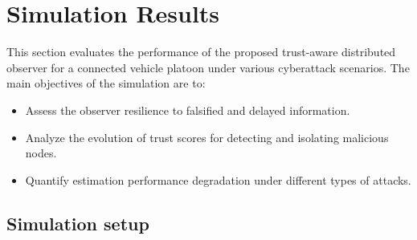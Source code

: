 \section{Simulation Results}\label{sec_simulation}
\vspace*{-0.3cm}

This section evaluates the performance of the proposed trust-aware distributed observer for a connected vehicle platoon under various cyberattack scenarios. The main objectives of the simulation are to:
\begin{itemize}
    \item Assess the observer resilience to falsified and delayed information.
    \item Analyze the evolution of trust scores for detecting and isolating malicious nodes.
    \item Quantify estimation performance degradation under different types of attacks.
\end{itemize}


 











\vspace*{-0.3cm}
\subsection {Simulation setup}
\vspace*{-0.3cm}

